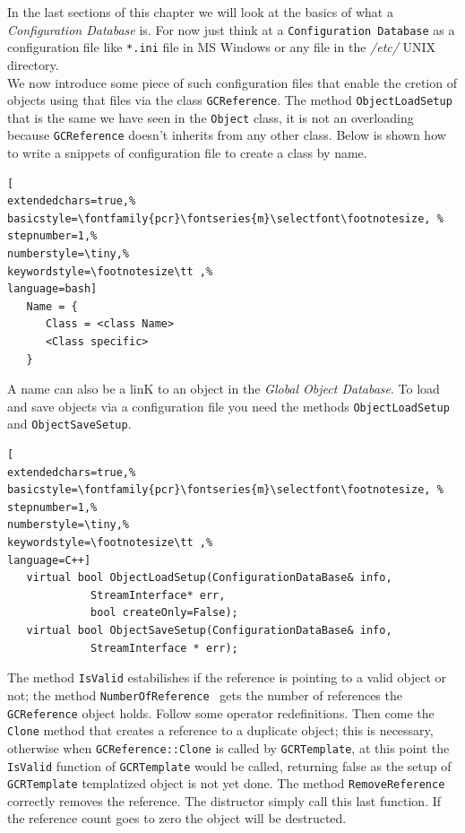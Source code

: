 In the last sections of this chapter we will look at the basics of what a \textit{Configuration Database} is. For now just think at a \texttt{Configuration Database} as a configuration file like \texttt{*.ini} file in MS Windows or any file in the \textit{/etc/} UNIX directory. \\


We now introduce some piece of such configuration files that enable the cretion of objects using that files via the class \texttt{GCReference}. The method \texttt{ObjectLoadSetup} that is the same we have seen in the \texttt{Object} class, it is not an overloading because \texttt{GCReference} doesn't inherits from any other class. 
Below is shown how to write a snippets of configuration file to create a class by name.
\begin{lstlisting}[
extendedchars=true,%
basicstyle=\fontfamily{pcr}\fontseries{m}\selectfont\footnotesize, %
stepnumber=1,%
numberstyle=\tiny,%
keywordstyle=\footnotesize\tt ,%
language=bash]
   Name = {
      Class = <class Name>
      <Class specific>
   }
\end{lstlisting}

A name can also be a linK to an object in the \textit{Global Object Database}. To load and save objects via a configuration file you need the methods \texttt{ObjectLoadSetup} and \texttt{ObjectSaveSetup}.

\begin{lstlisting}[
extendedchars=true,%
basicstyle=\fontfamily{pcr}\fontseries{m}\selectfont\footnotesize, %
stepnumber=1,%
numberstyle=\tiny,%
keywordstyle=\footnotesize\tt ,%
language=C++]
   virtual bool ObjectLoadSetup(ConfigurationDataBase& info,
             StreamInterface* err,
             bool createOnly=False);
   virtual bool ObjectSaveSetup(ConfigurationDataBase& info,
             StreamInterface * err);
\end{lstlisting}

The method \texttt{IsValid} estabilishes if the reference is pointing to a valid object or not; the method \texttt{NumberOfReference } gets the number of references the \texttt{GCReference} object holds. Follow some operator redefinitions. Then come the \texttt{Clone} method that creates a reference to a duplicate object; this is necessary, otherwise when \texttt{GCReference::Clone} is called by \texttt{GCRTemplate}, at this point the \texttt{IsValid} function of \texttt{GCRTemplate} would be called, returning false as the setup of \texttt{GCRTemplate} templatized object is not yet done.
The method \texttt{RemoveReference} correctly removes the reference. The distructor simply call this last function. If the reference count goes to zero the object will be destructed.

